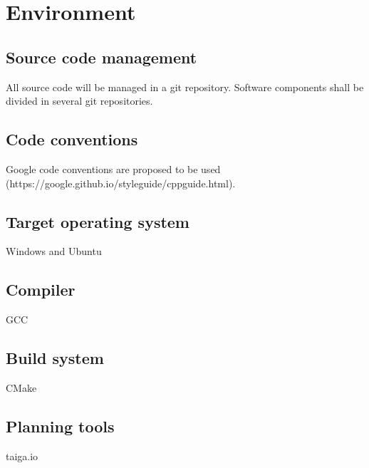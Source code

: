 \documentclass{styles/assisi}
\begin{document}
\chapter{Environment}\label{chap:Environment}

\section {Source code management}
All source code will be managed in a git repository. Software components shall be divided in several git repositories.

\section {Code conventions}
Google code conventions are proposed to be used (https://google.github.io/styleguide/cppguide.html).

\section {Target operating system}
Windows and Ubuntu

\section {Compiler}
GCC

\section {Build system}
CMake

\section {Planning tools}
taiga.io
\end{document}
